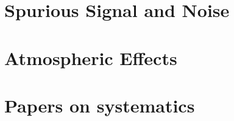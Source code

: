 \documentclass[
12pt, %
letterpaper, %
oneside, %
headinclude,footinclude, %
BCOR5mm, %
]{scrartcl}
\begin{document}
\section{Spurious Signal and Noise}


\section{Atmospheric Effects}


\section{Papers on systematics}




 


\renewcommand{\refname}{\spacedlowsmallcaps{References}} %


\end{document}
